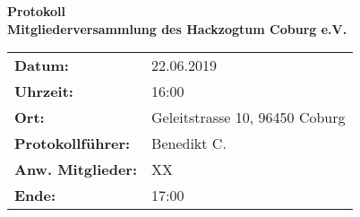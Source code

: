 

\newcommand{\myTitle}{
Mitgliederversammlung des Hackzogtum Coburg e.V.
}

\newcommand{\myDate}{
22.06.2019
}  
\newcommand{\myTime}{
16:00
}

\newcommand{\myTimeEnd}{
17:00
}
  
\newcommand{\myPlace}{
Geleitstrasse 10, 96450 Coburg
}  
\newcommand{\myAuthor}{
Benedikt C.
} 
\newcommand{\myChief}{
        Florian O.
}
\newcommand{\myMember}{
XX
} \newcommand{\myGuests}{
0
}  


\begin{center}

        \begin{huge}
                \textbf{ Protokoll \\ \vspace{15px} \myTitle}
        \end{huge}

\end{center}


\begin{table}[h]
        \centering
                \begin{tabular} {>{\bfseries}l l}
                
                        Datum: & \myDate \\  
                        Uhrzeit: & \myTime \\
                        Ort: & \myPlace \\
                        Protokollführer: & \myAuthor  \\
                        Anw. Mitglieder: & \myMember  \\
                        Ende: & \myTimeEnd  \\
                \end{tabular}
\end{table}

               


